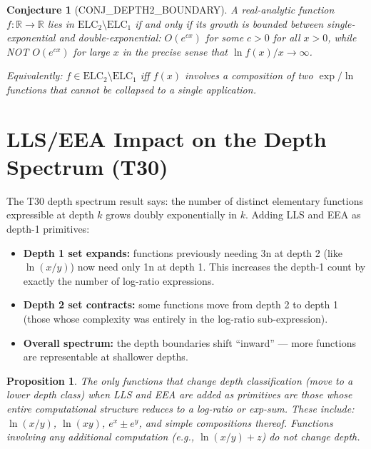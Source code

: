 \documentclass[11pt]{article}
\newtheorem{proposition}[theorem]{Proposition}
\newtheorem{conjecture}[theorem]{Conjecture}
\begin{document}
\begin{conjecture}[CONJ\_DEPTH2\_BOUNDARY]
A real-analytic function $f : \mathbb{R} \to \mathbb{R}$ lies in
$\mathrm{ELC}_2 \setminus \mathrm{ELC}_1$ if and only if its growth is
bounded between single-exponential and double-exponential:
$O(e^{cx})$ for some $c > 0$ for all $x > 0$, while NOT $O(e^{cx})$ for large $x$
in the precise sense that $\ln f(x) / x \to \infty$.

Equivalently: $f \in \mathrm{ELC}_2 \setminus \mathrm{ELC}_1$ iff
$f(x)$ involves a composition of two $\exp/\ln$ functions that cannot be
collapsed to a single application.
\end{conjecture}

\section{LLS/EEA Impact on the Depth Spectrum (T30)}
\label{sec:t30}

The T30 depth spectrum result says: the number of distinct elementary functions
expressible at depth $k$ grows doubly exponentially in $k$.
Adding LLS and EEA as depth-1 primitives:
\begin{itemize}
  \item \textbf{Depth 1 set expands:} functions previously needing 3n at depth 2
        (like $\ln(x/y)$) now need only 1n at depth 1.
        This increases the depth-1 count by exactly the number of log-ratio expressions.
  \item \textbf{Depth 2 set contracts:} some functions move from depth 2 to depth 1
        (those whose complexity was entirely in the log-ratio sub-expression).
  \item \textbf{Overall spectrum:} the depth boundaries shift ``inward'' --- more functions
        are representable at shallower depths.
\end{itemize}

\begin{proposition}
The only functions that change depth classification (move to a lower depth class)
when LLS and EEA are added as primitives are those whose \emph{entire}
computational structure reduces to a log-ratio or exp-sum.
These include: $\ln(x/y)$, $\ln(xy)$, $e^x \pm e^y$, and simple compositions thereof.
Functions involving any additional computation (e.g., $\ln(x/y) + z$) do not
change depth.
\end{proposition}
\end{document}
